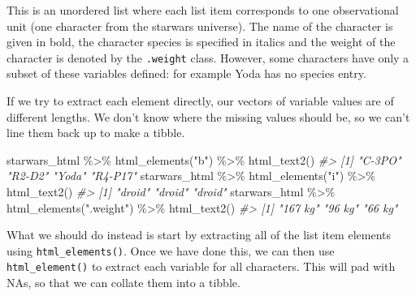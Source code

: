 \documentclass[
  12pt,
]{book}
\newenvironment{Shaded}{\begin{snugshade}}{\end{snugshade}}
\newcommand{\CommentTok}[1]{\textcolor[rgb]{0.56,0.35,0.01}{\textit{#1}}}
\newcommand{\FunctionTok}[1]{\textcolor[rgb]{0.00,0.00,0.00}{#1}}
\newcommand{\NormalTok}[1]{#1}
\newcommand{\SpecialCharTok}[1]{\textcolor[rgb]{0.00,0.00,0.00}{#1}}
\newcommand{\StringTok}[1]{\textcolor[rgb]{0.31,0.60,0.02}{#1}}
\begin{document}
This is an unordered list where each list item corresponds to one observational unit (one character from the starwars universe). The name of the character is given in bold, the character species is specified in italics and the weight of the character is denoted by the \texttt{.weight} class. However, some characters have only a subset of these variables defined: for example Yoda has no species entry.

If we try to extract each element directly, our vectors of variable values are of different lengths. We don't know where the missing values should be, so we can't line them back up to make a tibble.

\begin{Shaded}
\begin{Highlighting}[]
\NormalTok{starwars\_html }\SpecialCharTok{\%\textgreater{}\%} \FunctionTok{html\_elements}\NormalTok{(}\StringTok{"b"}\NormalTok{) }\SpecialCharTok{\%\textgreater{}\%} \FunctionTok{html\_text2}\NormalTok{()}
\CommentTok{\#\textgreater{} [1] "C{-}3PO"  "R2{-}D2"  "Yoda"   "R4{-}P17"}
\NormalTok{starwars\_html }\SpecialCharTok{\%\textgreater{}\%} \FunctionTok{html\_elements}\NormalTok{(}\StringTok{"i"}\NormalTok{) }\SpecialCharTok{\%\textgreater{}\%} \FunctionTok{html\_text2}\NormalTok{()}
\CommentTok{\#\textgreater{} [1] "droid" "droid" "droid"}
\NormalTok{starwars\_html }\SpecialCharTok{\%\textgreater{}\%} \FunctionTok{html\_elements}\NormalTok{(}\StringTok{".weight"}\NormalTok{) }\SpecialCharTok{\%\textgreater{}\%} \FunctionTok{html\_text2}\NormalTok{()}
\CommentTok{\#\textgreater{} [1] "167 kg" "96 kg"  "66 kg"}
\end{Highlighting}
\end{Shaded}

What we should do instead is start by extracting all of the list item elements using \texttt{html\_elements()}. Once we have done this, we can then use \texttt{html\_element()} to extract each variable for all characters. This will pad with NAs, so that we can collate them into a tibble.
\end{document}
